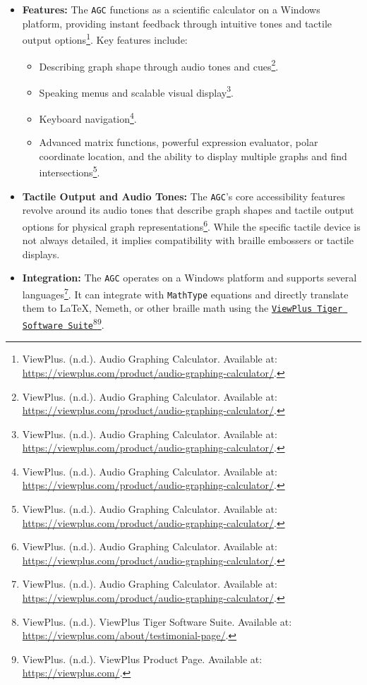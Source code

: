 \begin{itemize}
    \item \textbf{Features:} The \texttt{AGC} functions as a scientific calculator on a Windows platform, providing instant feedback through intuitive tones and tactile output options\footnote{ViewPlus. (n.d.). Audio Graphing Calculator. Available at: \url{https://viewplus.com/product/audio-graphing-calculator/}.}. Key features include:
    \begin{itemize}
        \item Describing graph shape through audio tones and cues\footnote{ViewPlus. (n.d.). Audio Graphing Calculator. Available at: \url{https://viewplus.com/product/audio-graphing-calculator/}.}.
        \item Speaking menus and scalable visual display\footnote{ViewPlus. (n.d.). Audio Graphing Calculator. Available at: \url{https://viewplus.com/product/audio-graphing-calculator/}.}.
        \item Keyboard navigation\footnote{ViewPlus. (n.d.). Audio Graphing Calculator. Available at: \url{https://viewplus.com/product/audio-graphing-calculator/}.}.
        \item Advanced matrix functions, powerful expression evaluator, polar coordinate location, and the ability to display multiple graphs and find intersections\footnote{ViewPlus. (n.d.). Audio Graphing Calculator. Available at: \url{https://viewplus.com/product/audio-graphing-calculator/}.}.
    \end{itemize}
    \item \textbf{Tactile Output and Audio Tones:} The \texttt{AGC}'s core accessibility features revolve around its audio tones that describe graph shapes and tactile output options for physical graph representations\footnote{ViewPlus. (n.d.). Audio Graphing Calculator. Available at: \url{https://viewplus.com/product/audio-graphing-calculator/}.}. While the specific tactile device is not always detailed, it implies compatibility with braille embossers or tactile displays.
    \item \textbf{Integration:} The \texttt{AGC} operates on a Windows platform and supports several languages\footnote{ViewPlus. (n.d.). Audio Graphing Calculator. Available at: \url{https://viewplus.com/product/audio-graphing-calculator/}.}. It can integrate with \texttt{MathType} equations and directly translate them to LaTeX, Nemeth, or other braille math using the \href{https://viewplus.com/about/testimonial-page/}{\texttt{ViewPlus Tiger Software Suite}}\footnote{ViewPlus. (n.d.). ViewPlus Tiger Software Suite. Available at: \url{https://viewplus.com/about/testimonial-page/}.}\footnote{ViewPlus. (n.d.). ViewPlus Product Page. Available at: \url{https://viewplus.com/}.}.
\end{itemize}
